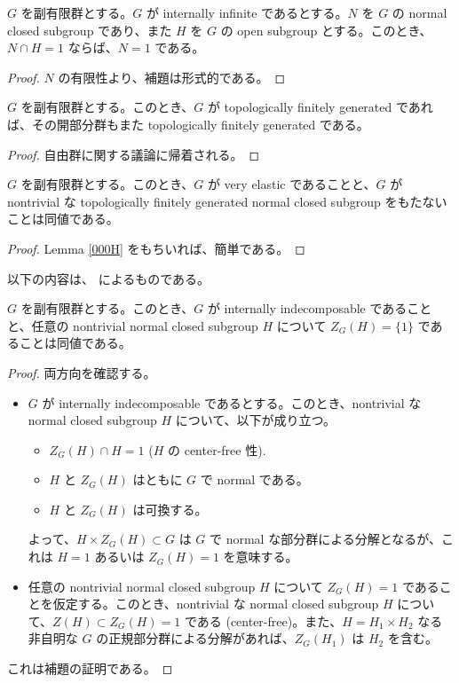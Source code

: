 \begin{lem}\label{0009}
  $G$ を副有限群とする。$G$ が internally infinite であるとする。$N$ を $G$ の normal closed subgroup であり、また $H$ を $G$ の open subgroup とする。このとき、$N \cap H = 1$ ならば、$N = 1$ である。
\end{lem}
\begin{proof}
  $N$ の有限性より、補題は形式的である。
\end{proof}

\begin{lem}\label{000H}
  $G$ を副有限群とする。このとき、$G$ が topologically finitely generated であれば、その開部分群もまた topologically finitely generated である。
\end{lem}
\begin{proof}
  自由群に関する議論に帰着される。
\end{proof}

\begin{lem}\label{000I}
  $G$ を副有限群とする。このとき、$G$ が very elastic であることと、$G$ が nontrivial な topologically finitely generated normal closed subgroup をもたないことは同値である。
\end{lem}
\begin{proof}
  Lemma \ref{000H} をもちいれば、簡単である。
\end{proof}

以下の内容は、\cite{IntIndecomp} によるものである。

\begin{lem}\label{0005}
  $G$ を副有限群とする。このとき、$G$ が internally indecomposable であることと、任意の nontrivial normal closed subgroup $H$ について $Z_G(H) = \{1\}$ であることは同値である。
\end{lem}
\begin{proof}
  両方向を確認する。
  \begin{itemize}
    \item $G$ が internally indecomposable であるとする。このとき、nontrivial な normal closed subgroup $H$ について、以下が成り立つ。
    \begin{itemize}
      \item $Z_G(H) \cap H = 1$ ($H$ の center-free 性).
      \item $H$ と $Z_G(H)$ はともに $G$ で normal である。
      \item $H$ と $Z_G(H)$ は可換する。
    \end{itemize}
    よって、$H \times Z_G(H) \subset G$ は $G$ で normal な部分群による分解となるが、これは $H = 1$ あるいは $Z_G(H) = 1$ を意味する。
    \item 任意の nontrivial normal closed subgroup $H$ について $Z_G(H) = 1$ であることを仮定する。このとき、nontrivial な normal closed subgroup $H$ について、$Z(H) \subset Z_G(H) = 1$ である (center-free)。また、$H = H_1 \times H_2$ なる非自明な $G$ の正規部分群による分解があれば、$Z_{G}(H_1)$ は $H_2$ を含む。
  \end{itemize}
  これは補題の証明である。
\end{proof}

